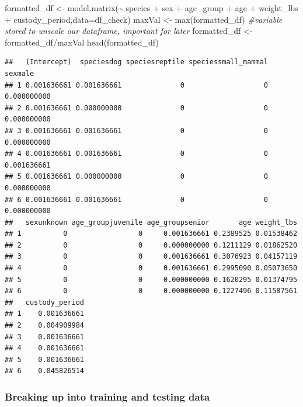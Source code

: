 \documentclass[
]{article}
\newenvironment{Shaded}{\begin{snugshade}}{\end{snugshade}}
\newcommand{\AttributeTok}[1]{\textcolor[rgb]{0.77,0.63,0.00}{#1}}
\newcommand{\CommentTok}[1]{\textcolor[rgb]{0.56,0.35,0.01}{\textit{#1}}}
\newcommand{\FunctionTok}[1]{\textcolor[rgb]{0.00,0.00,0.00}{#1}}
\newcommand{\NormalTok}[1]{#1}
\newcommand{\OtherTok}[1]{\textcolor[rgb]{0.56,0.35,0.01}{#1}}
\newcommand{\SpecialCharTok}[1]{\textcolor[rgb]{0.00,0.00,0.00}{#1}}
\begin{document}
\begin{Shaded}
\begin{Highlighting}[]
\NormalTok{formatted\_df }\OtherTok{\textless{}{-}} \FunctionTok{model.matrix}\NormalTok{(}\SpecialCharTok{\textasciitilde{}}\NormalTok{ species }\SpecialCharTok{+}\NormalTok{ sex }\SpecialCharTok{+}\NormalTok{ age\_group }\SpecialCharTok{+}\NormalTok{ age }\SpecialCharTok{+}\NormalTok{ weight\_lbs }\SpecialCharTok{+}\NormalTok{ custody\_period,}\AttributeTok{data=}\NormalTok{df\_check)}
\NormalTok{maxVal }\OtherTok{\textless{}{-}} \FunctionTok{max}\NormalTok{(formatted\_df) }\CommentTok{\#variable stored to unscale our dataframe, important for later}
\NormalTok{formatted\_df }\OtherTok{\textless{}{-}}\NormalTok{ formatted\_df}\SpecialCharTok{/}\NormalTok{maxVal}
\FunctionTok{head}\NormalTok{(formatted\_df)}
\end{Highlighting}
\end{Shaded}

\begin{verbatim}
##   (Intercept)  speciesdog speciesreptile speciessmall_mammal     sexmale
## 1 0.001636661 0.001636661              0                   0 0.000000000
## 2 0.001636661 0.000000000              0                   0 0.000000000
## 3 0.001636661 0.001636661              0                   0 0.000000000
## 4 0.001636661 0.001636661              0                   0 0.001636661
## 5 0.001636661 0.000000000              0                   0 0.000000000
## 6 0.001636661 0.001636661              0                   0 0.000000000
##   sexunknown age_groupjuvenile age_groupsenior       age weight_lbs
## 1          0                 0     0.001636661 0.2389525 0.01538462
## 2          0                 0     0.000000000 0.1211129 0.01862520
## 3          0                 0     0.001636661 0.3076923 0.04157119
## 4          0                 0     0.001636661 0.2995090 0.05073650
## 5          0                 0     0.000000000 0.1620295 0.01374795
## 6          0                 0     0.000000000 0.1227496 0.11587561
##   custody_period
## 1    0.001636661
## 2    0.004909984
## 3    0.001636661
## 4    0.001636661
## 5    0.001636661
## 6    0.045826514
\end{verbatim}

\hypertarget{breaking-up-into-training-and-testing-data}{%
\subsubsection{Breaking up into training and testing
data}\label{breaking-up-into-training-and-testing-data}}
\end{document}
